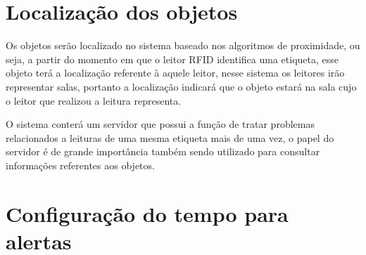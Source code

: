 \section{Localização dos objetos}
Os objetos serão localizado no sistema baseado nos algoritmos de proximidade, ou seja, a partir do momento em que o leitor RFID identifica uma etiqueta, esse objeto terá a localização referente à aquele leitor, nesse sistema os leitores irão representar salas, portanto a localização indicará que o objeto estará na sala cujo o leitor que realizou a leitura representa.
\par
O sistema conterá um servidor que possui a função de tratar problemas relacionados a leituras de uma mesma etiqueta mais de uma vez, o papel do servidor é de grande importância também sendo utilizado para consultar informações referentes aos objetos.

\section{Configuração do tempo para alertas}

